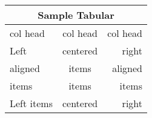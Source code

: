 \documentclass{book}
\begin{document}
\centering
\arrayrulewidth=1pt
\begin{tabular}{|l|c|r|}\hline
\multicolumn{3}{|c|}{Sample Tabular}\\\hline
col head & col head & col head\\
\hline Left & centered & right \\\cline{1-2}
aligned & items & aligned \\\cline{2-3}
items & items & items \\\cline{1-2}
Left items & centered & right \\\hline
\end{tabular}
\end{document}
